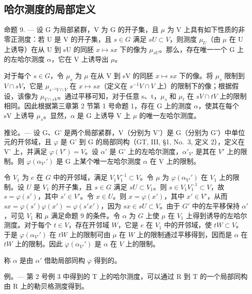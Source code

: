 \subsection{哈尔测度的局部定义}

命题 9. --- 设 G 为局部紧群，V 为 G 的开子集，且 \(\mu\) 为 V 上具有如下性质的非零正测度：若 U 是 V 的开子集，且 \(s \in G\) 满足 \(sU \subset V\)，则测度 \(\mu_{U}\)（由 \(\mu\) 在 U 上诱导）在从 U 到 sU 的同胚 \(x \mapsto sx\) 下的像为 \(\mu_{sU}\)。那么，存在唯一一个 G 上的左哈尔测度 \(\alpha\)，它在 V 上诱导出 \(\mu\)。

对于每个 \(s \in G\)，令 \(\mu_{s}\) 为 \(\mu\) 在从 V 到 sV 的同胚 \(x \mapsto sx\) 下的像。将 \(\mu_{s}\) 限制到 \(V \cap sV\)，它是 \(\mu_{s^{-1}V \cap V}\) 在 \(x \mapsto sx\)（定义在 \(s^{-1}V \cap V\) 上）的限制下的像；根据假设，该像为 \(\mu_{V \cap sV}\)。通过平移可知，对于任意 s、t，\(\mu_{s}\) 和 \(\mu_{t}\) 在 \(sV \cap tV\) 上的限制相同。因此根据第三章第 2 节第 1 号命题 1，存在 G 上的测度 \(\alpha\)，使其在每个 sV 上诱导 \(\mu_{s}\)。显然，\(\alpha\) 是 G 上诱导 V 上 \(\mu\) 的唯一左哈尔测度。

推论。--- 设 G、G' 是两个局部紧群，V（分别为 V'）是 G（分别为 G'）中单位元的开邻域，且 \(\varphi\) 是 G' 到 G 的局部同构（GT, III, §1, No.~3, 定义 2），定义在 V' 上，并满足 \(\varphi(V') = V\)。设 \(\alpha'\) 是 G' 上的左哈尔测度，\(\alpha'_{V'}\) 是其在 \(V'\) 上的限制。则 \(\varphi(\alpha_{V'}')\) 是 G 上某个唯一左哈尔测度 \(\alpha\) 在 V 上的限制。

令 \(V_1\) 为 \(e\) 在 \(G\) 中的开邻域，满足 \(V_1V_1^{-1} \subset V\)。令 \(\mu\) 为 \(\varphi(\alpha_{V'}')\) 在 \(V_1\) 上的限制。设 \(U\) 是 \(V_1\) 的开子集，且 \(s \in G\) 满足 \(sU \subset V_1\)。则 \(s \in V_1V_1^{-1} \subset V\)，故 \(s = \varphi(s')\)，其中 \(s' \in V'\)。令 \(x \in U\)。则 \(x = \varphi(x')\)，其中 \(x' \in V'\)，从而 \(sx = \varphi(s')\varphi(x') = \varphi(s'x')\)，因为 \(sx \in sU \subset V\)。由于 \(G'\) 中的左平移保持 \(\alpha'\)，可见 \(V_1\) 和 \(\mu\) 满足命题 9 的条件。令 \(\alpha\) 为 \(G\) 上使 \(\mu\) 在 \(V_1\) 上得到诱导的左哈尔测度。对于每个 \(t \in V\)，存在开邻域 \(W\)，它是 \(e\) 在 \(V_1\) 中的开邻域，使 \(tW \subset V\)。于是 \(\varphi(\alpha_{V'}')\) 在 \(tW\) 上的限制可由 \(\mu\) 在 \(W\) 上的限制通过平移得到，因而是 \(\alpha\) 在 \(tW\) 上的限制。因此 \(\varphi(\alpha_{V'}')\) 是 \(\alpha\) 在 \(V\) 上的限制。

称 \(\alpha\) 是由 \(\alpha'\) 借助局部同构 \(\varphi\) 得到的。

例。--- 第 2 号例 3 中得到的 T 上的哈尔测度，可以通过 R 到 T 的一个局部同构由 R 上的勒贝格测度得到。

